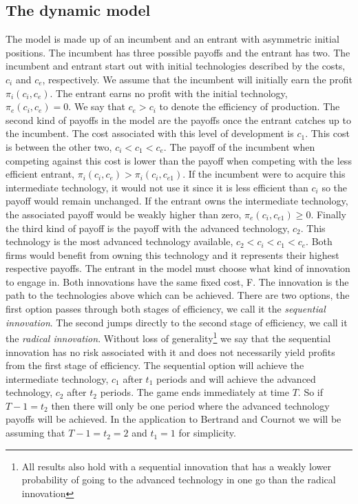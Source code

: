 \subsection{The dynamic model}\label{dynamic}
The model is made up of an incumbent and an entrant with asymmetric initial positions. The incumbent has three possible payoffs and the entrant has two. The incumbent and entrant start out with initial technologies described by the costs, $c_i$ and $c_e$, respectively. We assume that the incumbent will initially earn the profit $\pi_i(c_i,c_e)$. The entrant earns no profit with the initial technology, $\pi_e(c_i,c_e)=0$. We say that $c_e>c_i$ to denote the efficiency of production. 
The second kind of payoffs in the model are the payoffs once the entrant catches up to the incumbent. The cost associated with this level of development is $c_{1}$. This cost is between the other two, $c_i<c_{1}<c_e$. The payoff of the incumbent when competing against this cost is lower than the payoff when competing with the less efficient entrant, $ \pi_i( c_i,c_{e}) > \pi_i( c_i, c_{e1} )$. If the incumbent were to acquire this intermediate technology, it would not use it since it is less efficient than $c_i$ so the payoff would remain unchanged. If the entrant owns the intermediate technology, the associated payoff would be weakly higher than zero, $\pi_e(c_i,c_{e1}) \geq 0$.
Finally the third kind of payoff is the payoff with the advanced technology, $c_2$. This technology is the most advanced technology available, $c_2<c_i<c_1<c_e$. Both firms would benefit from owning this technology and it represents their highest respective payoffs. 
The entrant in the model must choose what kind of innovation to engage in. Both innovations have the same fixed cost, F. The innovation is the path to the technologies above which can be achieved. There are two options, the first option passes through both stages of efficiency, we call it the \textit{sequential innovation}. The second jumps directly to the second stage of efficiency, we call it the \textit{radical innovation}.  
Without loss of generality\footnote{All results also hold with a sequential innovation that has a weakly lower probability of going to the advanced technology in one go than the radical innovation} we say that the sequential innovation has no risk associated with it and does not necessarily yield profits from the first stage of efficiency. The sequential option will achieve the intermediate technology, $c_1$ after $t_1$ periods and will achieve the advanced technology, $c_2$ after $t_2$ periods. The game ends immediately at time $T$. So if $T-1=t_2$ then there will only be one period where the advanced technology payoffs will be achieved. In the application to Bertrand and Cournot we will be assuming that $T-1=t_2=2$ and $t_1=1$ for simplicity. 
